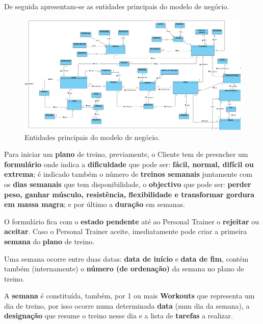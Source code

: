 \hspace{5mm} De seguida apresentam-se as entidades principais do modelo de negócio.

\begin{figure}[H]
    \centering
    \includegraphics[scale=0.37]{images/modelação/core.png}
    \caption{Entidades principais do modelo de negócio.}
    \label{fig:interfaceperfilptbycliente}
\end{figure}

\hspace{5mm} Para iniciar um \textbf{plano} de treino, previamente, o Cliente tem de preencher um \textbf{formulário} onde indica a \textbf{dificuldade} que pode ser: \textbf{fácil, normal, difícil ou extrema}; é indicado também o número de \textbf{treinos semanais} juntamente com os \textbf{dias semanais} que tem disponibilidade, o \textbf{objectivo} que pode ser: \textbf{perder peso, ganhar músculo, resistência, flexibilidade e transformar gordura em massa magra}; e por último a \textbf{duração} em semanas.

\hspace{5mm} O formulário fica com o \textbf{estado pendente} até ao Personal Trainer o \textbf{rejeitar} ou \textbf{aceitar}. Caso o Personal Trainer aceite, imediatamente pode criar a primeira \textbf{semana} do \textbf{plano} de treino. 

\hspace{5mm} Uma semana ocorre entre duas datas: \textbf{data de início} e \textbf{data de fim}, contém também (internamente) o \textbf{número (de ordenação)} da semana no plano de treino. 

\hspace{5mm} A \textbf{semana} é constituída, também, por 1 ou mais \textbf{Workouts} que representa um dia de treino, por isso ocorre numa determinada \textbf{data} (num dia da semana), a \textbf{designação} que resume o treino nesse dia e a lista de \textbf{tarefas} a realizar.


